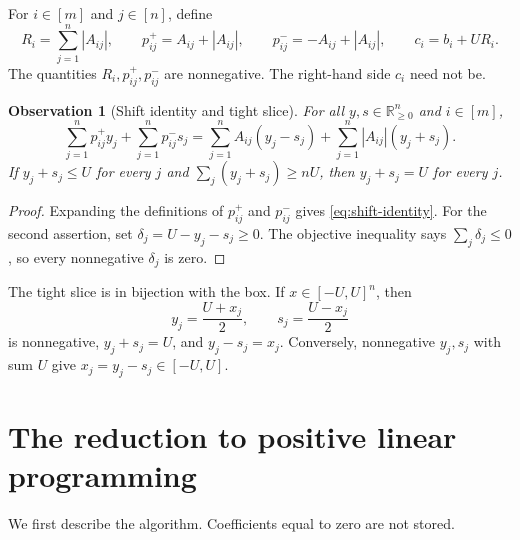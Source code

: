 \documentclass[11pt]{article}
\newtheorem{observation}[theorem]{Observation}
\theoremstyle{remark}
\newcommand{\R}{\mathbb{R}}
\begin{document}
For $i\in[m]$ and $j\in[n]$, define
\begin{equation}
  \label{eq:shift-data}
  R_i=\sum_{j=1}^n|A_{ij}|,
  \qquad
  p^+_{ij}=A_{ij}+|A_{ij}|,
  \qquad
  p^-_{ij}=-A_{ij}+|A_{ij}|,
  \qquad
  c_i=b_i+UR_i.
\end{equation}
The quantities $R_i,p^+_{ij},p^-_{ij}$ are nonnegative.  The
right-hand side $c_i$ need not be.

\begin{observation}[Shift identity and tight slice]
\label{obs:shift-tight}
For all $y,s\in\R_{\geq0}^n$ and $i\in[m]$,
\begin{equation}
  \label{eq:shift-identity}
  \sum_{j=1}^n p^+_{ij}y_j+
  \sum_{j=1}^n p^-_{ij}s_j
  =
  \sum_{j=1}^n A_{ij}(y_j-s_j)+
  \sum_{j=1}^n |A_{ij}|(y_j+s_j).
\end{equation}
If $y_j+s_j\leq U$ for every $j$ and
$\sum_j(y_j+s_j)\geq nU$, then $y_j+s_j=U$ for every
$j$.
\end{observation}

\begin{proof}
Expanding the definitions of $p^+_{ij}$ and $p^-_{ij}$ gives
\eqref{eq:shift-identity}.  For the second assertion, set
$\delta_j=U-y_j-s_j\geq0$.  The objective inequality says
$\sum_j\delta_j\leq0$, so every nonnegative $\delta_j$ is zero.
\end{proof}

The tight slice is in bijection with the box.  If $x\in[-U,U]^n$,
then
\begin{equation}
  \label{eq:encode}
  y_j=\frac{U+x_j}{2},
  \qquad
  s_j=\frac{U-x_j}{2}
\end{equation}
is nonnegative, $y_j+s_j=U$, and $y_j-s_j=x_j$.
Conversely, nonnegative $y_j,s_j$ with sum $U$ give
$x_j=y_j-s_j\in[-U,U]$.

\section{The reduction to positive linear programming}
\label{sec:reduction}

We first describe the algorithm.  Coefficients equal to zero are not
stored.
\end{document}
